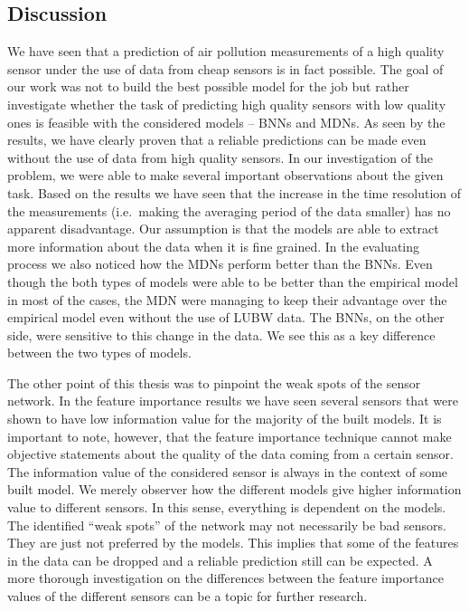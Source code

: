 \documentclass[12pt,a4paper,twoside]{scrartcl}
\numberwithin{equation}{section}
\begin{document}
\subsection{Discussion}
We have seen that a prediction of air pollution measurements of a high quality sensor under the use of data from cheap sensors is in fact possible. The goal of our work was not to build the best possible model for the job but rather investigate whether the task of predicting high quality sensors with low quality ones is feasible with the considered models -- BNNs and MDNs. As seen by the results, we have clearly proven that a reliable predictions can be made even without the use of data from high quality sensors. In our investigation of the problem, we were able to make several important observations about the given task. Based on the results we have seen that the increase in the time resolution of the measurements (i.e.\ making the averaging period of the data smaller) has no apparent disadvantage. Our assumption is that the models are able to extract more information about the data when it is fine grained. In the evaluating process we also noticed how the MDNs perform better than the BNNs. Even though the both types of models were able to be better than the empirical model in most of the cases, the MDN were managing to keep their advantage over the empirical model even without the use of LUBW data. The BNNs, on the other side, were sensitive to this change in the data. We see this as a key difference between the two types of models.

The other point of this thesis was to pinpoint the weak spots of the sensor network. In the feature importance results we have seen several sensors that were shown to have low information value for the majority of the built models. It is important to note, however, that the feature importance technique cannot make objective statements about the quality of the data coming from a certain sensor. The information value of the considered sensor is always in the context of some built model. We merely observer how the different models give higher information value to different sensors. In this sense, everything is dependent on the models. The identified ``weak spots'' of the network may not necessarily be bad sensors. They are just not preferred by the models. This implies that some of the features in the data can be dropped and a reliable prediction still can be expected. A more thorough investigation on the differences between the feature importance values of the different sensors can be a topic for further research.
\end{document}
